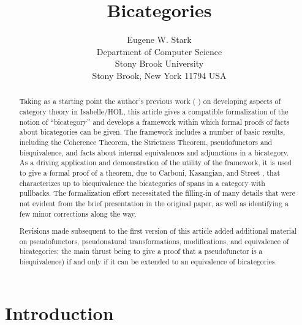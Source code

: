 \documentclass[11pt,notitlepage,a4paper]{report}
\begin{document}
\title{Bicategories}
\author{Eugene W. Stark\\[\medskipamount]
        Department of Computer Science\\
        Stony Brook University\\
        Stony Brook, New York 11794 USA}
\maketitle

\begin{abstract}
Taking as a starting point the author's previous work
(\cite{Category3-AFP} \cite{MonoidalCategory-AFP})
on developing aspects of category theory in Isabelle/HOL, this article gives a
compatible formalization of the notion of ``bicategory'' and develops a
framework within which formal proofs of facts about bicategories can be given.
The framework includes a number of basic results, including the
Coherence Theorem, the Strictness Theorem, pseudofunctors and biequivalence,
and facts about internal equivalences and adjunctions in a bicategory.
As a driving application and demonstration of the utility of the framework,
it is used to give a formal proof of a theorem, due to Carboni, Kasangian,
and Street \cite{carboni-et-al}, that characterizes up to biequivalence
the bicategories of spans in a category with pullbacks.
The formalization effort necessitated the filling-in of many details
that were not evident from the brief presentation in the original paper,
as well as identifying a few minor corrections along the way.

Revisions made subsequent to the first version of this article added additional
material on pseudofunctors, pseudonatural transformations, modifications, and equivalence
of bicategories; the main thrust being to give a proof that a pseudofunctor is
a biequivalence) if and only if it can be extended to an equivalence of bicategories.
\end{abstract}

\tableofcontents

{}
\chapter*{Introduction}
\end{document}
